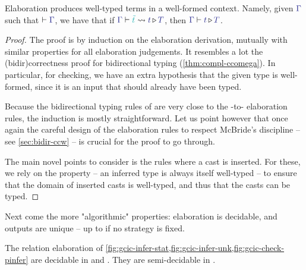 \begin{theorem}
  \label{thm:correction}
	Elaboration produces well-typed terms in a well-formed context.
  Namely, given $\tcol{\Gamma}$ such that $\vdash \tcol{\Gamma}$, we have that
	if $\inferelab{\Gamma}{\tilde{t}}{t}{T}$, then $\inferty{\tcol{\Gamma}}{\tcol{t}}{\tcol{T}}$.

\end{theorem}

\begin{proof}
  The proof is by induction on the elaboration derivation,
  mutually with similar properties for all elaboration judgements.
  It resembles a lot the \kl(bidir){correctness} proof for bidirectional typing
  (\cref{thm:compl-ccomega}).
  In particular, for checking, we have an extra hypothesis that the
  given type is well-formed, since it is an input that should already
  have been typed.

  Because the bidirectional typing rules of  are very close to the
  -to- elaboration rules, the induction is mostly straightforward.
  Let us point however that once again the careful design of the elaboration rules to
  respect McBride’s discipline – see \cref{sec:bidir-ccw} – is crucial for the
  proof to go through.

  The main novel points to consider is the rules where a cast is inserted.
  For these, we rely on the  property –
  an inferred type is always itself well-typed –
  to ensure that the domain of inserted casts is well-typed,
  and thus that the casts can be typed.
\end{proof}

Next come the more "algorithmic" properties: elaboration is decidable,
and outputs are unique – up to  if no strategy is fixed.

\begin{theorem}
	\label{thm:decidability}
	The relation elaboration of \cref{fig:gcic-infer-stat,fig:gcic-infer-unk,fig:gcic-check-pinfer}
  are decidable in  and . They are semi-decidable in .
\end{theorem}

